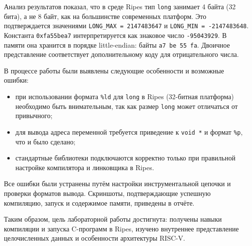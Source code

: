 \documentclass[12pt]{extarticle}
\begin{document}
Анализ результатов показал, что в среде Ripes тип \texttt{long} занимает 4 байта (32 бита), а не 8 байт, как на большинстве современных платформ. Это подтверждается значениями \texttt{LONG\_MAX = 2147483647} и \texttt{LONG\_MIN = -2147483648}. Константа \texttt{0xfa55bea7} интерпретируется как знаковое число \texttt{-95043929}. В памяти она хранится в порядке little-endian: байты \texttt{a7 be 55 fa}. Двоичное представление соответствует дополнительному коду для отрицательного числа.

В процессе работы были выявлены следующие особенности и возможные ошибки:
\begin{itemize}
    \item при использовании формата \texttt{\%ld} для \texttt{long} в Ripes (32-битная платформа) необходимо быть внимательным, так как размер \texttt{long} может отличаться от привычного;
    \item для вывода адреса переменной требуется приведение к \texttt{void *} и формат \texttt{\%p}, что и было сделано;
    \item стандартные библиотеки подключаются корректно только при правильной настройке компилятора и линковщика в Ripes.
\end{itemize}

Все ошибки были устранены путём настройки инструментальной цепочки и проверки форматов вывода. Скриншоты, подтверждающие успешную компиляцию, запуск и содержимое памяти, приведены в отчёте.

Таким образом, цель лабораторной работы достигнута: получены навыки компиляции и запуска C-программ в Ripes, изучено внутреннее представление целочисленных данных и особенности архитектуры RISC-V.
\end{document}
